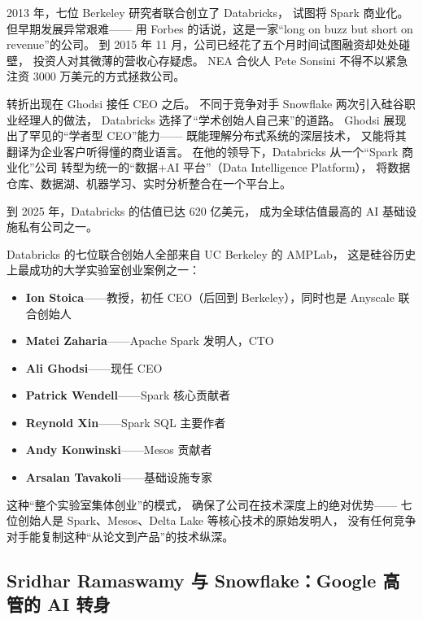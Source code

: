 2013 年，七位 Berkeley 研究者联合创立了 Databricks，
试图将 Spark 商业化。
但早期发展异常艰难——
用 Forbes 的话说，这是一家``long on buzz but short on revenue''的公司。
到 2015 年 11 月，公司已经花了五个月时间试图融资却处处碰壁，
投资人对其微薄的营收心存疑虑。
NEA 合伙人 Pete Sonsini 不得不以紧急注资 3000 万美元的方式拯救公司。

转折出现在 Ghodsi 接任 CEO 之后。
不同于竞争对手 Snowflake 两次引入硅谷职业经理人的做法，
Databricks 选择了``学术创始人自己来''的道路。
Ghodsi 展现出了罕见的``学者型 CEO''能力——
既能理解分布式系统的深层技术，
又能将其翻译为企业客户听得懂的商业语言。
在他的领导下，Databricks 从一个``Spark 商业化''公司
转型为统一的``数据+AI 平台''（Data Intelligence Platform），
将数据仓库、数据湖、机器学习、实时分析整合在一个平台上。

到 2025 年，Databricks 的估值已达 620 亿美元，
成为全球估值最高的 AI 基础设施私有公司之一。

\begin{whybox}
Databricks 的七位联合创始人全部来自 UC Berkeley 的 AMPLab，
这是硅谷历史上最成功的大学实验室创业案例之一：
\begin{itemize}[noitemsep]
  \item \textbf{Ion Stoica}——教授，初任 CEO（后回到 Berkeley），同时也是 Anyscale 联合创始人
  \item \textbf{Matei Zaharia}——Apache Spark 发明人，CTO
  \item \textbf{Ali Ghodsi}——现任 CEO
  \item \textbf{Patrick Wendell}——Spark 核心贡献者
  \item \textbf{Reynold Xin}——Spark SQL 主要作者
  \item \textbf{Andy Konwinski}——Mesos 贡献者
  \item \textbf{Arsalan Tavakoli}——基础设施专家
\end{itemize}
这种``整个实验室集体创业''的模式，
确保了公司在技术深度上的绝对优势——
七位创始人是 Spark、Mesos、Delta Lake 等核心技术的原始发明人，
没有任何竞争对手能复制这种``从论文到产品''的技术纵深。
\end{whybox}


\subsection{Sridhar Ramaswamy 与 Snowflake：Google 高管的 AI 转身}
\label{subsec:sridhar-ramaswamy}

